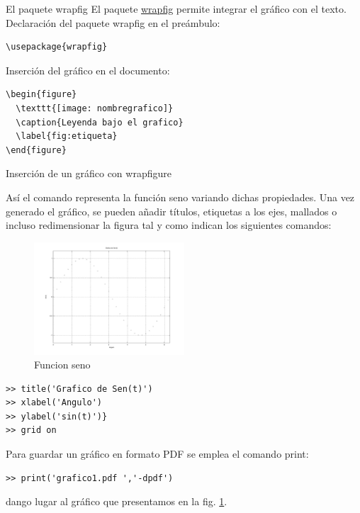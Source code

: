 \documentclass[10pt]{beamer}
\begin{document}
\begin{frame}[fragile]{El paquete wrapfig}
El paquete  \href{http://www.ctan.org/pkg/wrapfig}{wrapfig} permite integrar el gr\'afico con el texto.
\vskip 12pt
Declaraci\'on del paquete wrapfig en el pre\'ambulo:
\begin{verbatim} 
\usepackage{wrapfig} 
\end{verbatim}

Inserci\'on del gr\'afico en el documento:
\begin{verbatim}
\begin{figure}
  \texttt{[image: nombregrafico]}
  \caption{Leyenda bajo el grafico}
  \label{fig:etiqueta}
\end{figure}
\end{verbatim}

\end{frame}


\begin{frame}[fragile]{Inserci\'on de un gr\'afico con wrapfigure}

{\small As\'i el comando
representa la funci\'on seno variando dichas propiedades.
Una vez generado el gr\'afico, se pueden a\~nadir t\'itulos, etiquetas a los ejes, mallados o incluso redimensionar la figura
tal y como indican los siguientes comandos:
\begin{figure}
\begin{center}
\vspace{-20pt}
\includegraphics[width=0.5\textwidth]{graficos/sin.pdf}
  \end{center}
\vspace{-25pt}
  \caption{{\tiny Funcion seno \label{figura:sinestilo1}}}
\end{figure}
\vspace{-10pt}
\begin{verbatim}
>> title('Grafico de Sen(t)')
>> xlabel('Angulo')
>> ylabel('sin(t)')}
>> grid on
\end{verbatim}
Para guardar un gr\'afico en formato PDF se emplea el comando print:
\begin{verbatim}
>> print('grafico1.pdf ','-dpdf')
\end{verbatim}
dango lugar al gr\'afico que presentamos en la fig. \ref{figura:sinestilo1}.
}
\end{frame}
\end{document}
